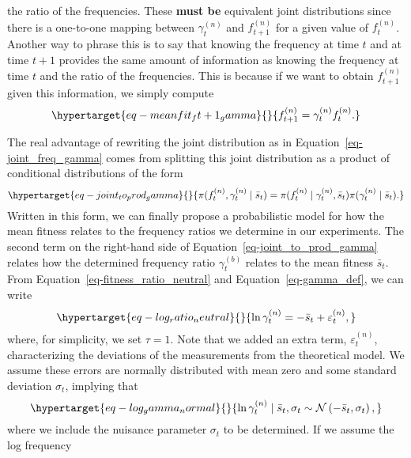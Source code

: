 \documentclass[
  letterpaper,
  DIV=11,
  numbers=noendperiod]{scrartcl}
\begin{document}
\begin{refsegment}
the ratio of the frequencies. These \textbf{must be} equivalent joint
distributions since there is a one-to-one mapping between
\(\gamma_t^{(n)}\) and \(f_{t+1}^{(n)}\) for a given value of
\(f_t^{(n)}\). Another way to phrase this is to say that knowing the
frequency at time \(t\) and at time \(t+1\) provides the same amount of
information as knowing the frequency at time \(t\) and the ratio of the
frequencies. This is because if we want to obtain \(f_{t+1}^{(n)}\)
given this information, we simply compute
\begin{equation}\protect\hypertarget{eq-meanfit_ft+1_gamma}{}{
f_{t+1}^{(n)} = \gamma_t^{(n)} f_t^{(n)}.
}\label{eq-meanfit_ft+1_gamma}\end{equation}

The real advantage of rewriting the joint distribution as in
Equation~\ref{eq-joint_freq_gamma} comes from splitting this joint
distribution as a product of conditional distributions of the form
\begin{equation}\protect\hypertarget{eq-joint_to_prod_gamma}{}{
\pi(f_t^{(n)}, \gamma_{t}^{(n)} \mid \bar{s}_t) =
\pi(f_t^{(n)} \mid \gamma_{t}^{(n)}, \bar{s}_t)
\pi(\gamma_{t}^{(n)} \mid \bar{s}_t).
}\label{eq-joint_to_prod_gamma}\end{equation} Written in this form, we
can finally propose a probabilistic model for how the mean fitness
relates to the frequency ratios we determine in our experiments. The
second term on the right-hand side of
Equation~\ref{eq-joint_to_prod_gamma} relates how the determined
frequency ratio \(\gamma_t^{(b)}\) relates to the mean fitness
\(\bar{s}_t\). From Equation~\ref{eq-fitness_ratio_neutral} and
Equation~\ref{eq-gamma_def}, we can write
\begin{equation}\protect\hypertarget{eq-log_ratio_neutral}{}{
\ln \gamma_t^{(n)} = - \bar{s}_t + \varepsilon_t^{(n)},
}\label{eq-log_ratio_neutral}\end{equation} where, for simplicity, we
set \(\tau = 1\). Note that we added an extra term,
\(\varepsilon_t^{(n)}\), characterizing the deviations of the
measurements from the theoretical model. We assume these errors are
normally distributed with mean zero and some standard deviation
\(\sigma_t\), implying that
\begin{equation}\protect\hypertarget{eq-log_gamma_normal}{}{
\ln \gamma_t^{(n)} \mid \bar{s}_t, \sigma_t  \sim 
\mathcal{N}\left(-\bar{s}_t, \sigma_t \right),
}\label{eq-log_gamma_normal}\end{equation} where we include the nuisance
parameter \(\sigma_t\) to be determined. If we assume the log frequency

\end{refsegment}
\end{document}
